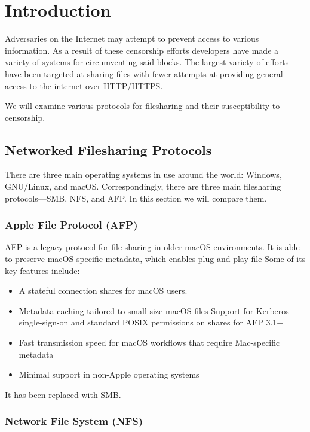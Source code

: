 \section{Introduction}\label{sec:intro}

Adversaries on the Internet may attempt to prevent access to various
information. As a result of these censorship efforts developers have made a
variety of systems for circumventing said blocks. The largest variety of efforts
have been targeted at sharing files with fewer attempts at providing general
access to the internet over \textsc{HTTP}/\textsc{HTTPS}.

We will examine various protocols for filesharing and their susceptibility to
censorship.

\subsection{Networked Filesharing Protocols}

There are three main operating systems in use around the world: Windows,
GNU/Linux, and macOS. Correspondingly, there are three main filesharing
protocols---SMB, NFS, and AFP. In this section we will compare them.

\subsubsection{Apple File Protocol (AFP)}

AFP is a legacy protocol for file sharing in older macOS environments. It is
able to preserve macOS-specific metadata, which enables plug-and-play file
Some of its key features include:
\begin{itemize}[nosep]
  \item A stateful connection shares for macOS users.
  \item Metadata caching tailored to small-size macOS files
        Support for Kerberos single-sign-on and standard POSIX permissions on shares for AFP 3.1+
  \item Fast transmission speed for macOS workflows that require Mac-specific metadata
  \item Minimal support in non-Apple operating systems
\end{itemize}
It has been replaced with SMB.

\subsubsection{Network File System (NFS)}

